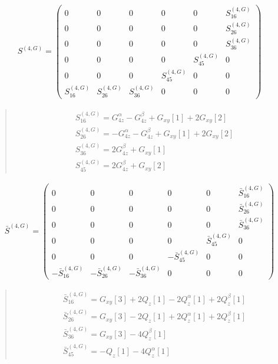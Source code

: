 \documentclass[fleqn,10pt]{jsarticle}
\begin{document}
\begin{align*}
S^{(4,G)} = \begin{pmatrix} 0 & 0 & 0 & 0 & 0 & S^{(4,G)}_{16} \\ 0 & 0 & 0 & 0 & 0 & S^{(4,G)}_{26} \\ 0 & 0 & 0 & 0 & 0 & S^{(4,G)}_{36} \\ 0 & 0 & 0 & 0 & S^{(4,G)}_{45} & 0 \\ 0 & 0 & 0 & S^{(4,G)}_{45} & 0 & 0 \\ S^{(4,G)}_{16} & S^{(4,G)}_{26} & S^{(4,G)}_{36} & 0 & 0 & 0 \end{pmatrix}
\end{align*}
\begin{quote}
\begin{align*}
& S^{(4,G)}_{16} = G_{4z}^{\alpha} - G_{4z}^{\beta} + G_{xy}[1] + 2 G_{xy}[2] \\
& S^{(4,G)}_{26} = - G_{4z}^{\alpha} - G_{4z}^{\beta} + G_{xy}[1] + 2 G_{xy}[2] \\
& S^{(4,G)}_{36} = 2 G_{4z}^{\beta} + G_{xy}[1] \\
& S^{(4,G)}_{45} = 2 G_{4z}^{\beta} + G_{xy}[2]
\end{align*}
\end{quote}
\begin{align*}
\bar{S}^{(4,G)} = \begin{pmatrix} 0 & 0 & 0 & 0 & 0 & \bar{S}^{(4,G)}_{16} \\ 0 & 0 & 0 & 0 & 0 & \bar{S}^{(4,G)}_{26} \\ 0 & 0 & 0 & 0 & 0 & \bar{S}^{(4,G)}_{36} \\ 0 & 0 & 0 & 0 & \bar{S}^{(4,G)}_{45} & 0 \\ 0 & 0 & 0 & - \bar{S}^{(4,G)}_{45} & 0 & 0 \\ - \bar{S}^{(4,G)}_{16} & - \bar{S}^{(4,G)}_{26} & - \bar{S}^{(4,G)}_{36} & 0 & 0 & 0 \end{pmatrix}
\end{align*}
\begin{quote}
\begin{align*}
& \bar{S}^{(4,G)}_{16} = G_{xy}[3] + 2 Q_{z}[1] - 2 Q_{z}^{\alpha}[1] + 2 Q_{z}^{\beta}[1] \\
& \bar{S}^{(4,G)}_{26} = G_{xy}[3] - 2 Q_{z}[1] + 2 Q_{z}^{\alpha}[1] + 2 Q_{z}^{\beta}[1] \\
& \bar{S}^{(4,G)}_{36} = G_{xy}[3] - 4 Q_{z}^{\beta}[1] \\
& \bar{S}^{(4,G)}_{45} = - Q_{z}[1] - 4 Q_{z}^{\alpha}[1]
\end{align*}
\end{quote}
\end{document}
